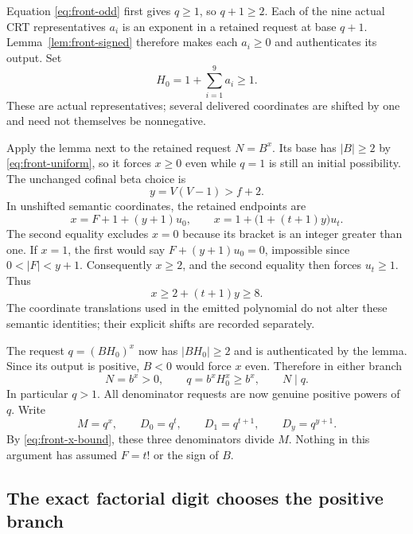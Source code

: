 \documentclass[11pt,letterpaper]{article}
\theoremstyle{definition}
\theoremstyle{remark}
\begin{document}
Equation \eqref{eq:front-odd} first gives $q\geq1$, so $q+1\geq2$.
Each of the nine actual CRT representatives $a_i$ is an exponent in a
retained request at base $q+1$.  Lemma~\ref{lem:front-signed} therefore
makes each $a_i\geq0$ and authenticates its output.  Set
\[
 H_0=1+\sum_{i=1}^{9}a_i\geq1.
\]
These are actual representatives; several delivered coordinates are
shifted by one and need not themselves be nonnegative.

Apply the lemma next to the retained request $N=B^x$.  Its base has
$|B|\geq2$ by \eqref{eq:front-uniform}, so it forces $x\geq0$ even
while $q=1$ is still an initial possibility.  The unchanged cofinal beta
choice is
\[
 y=V(V-1)>f+2.
\]
In unshifted semantic coordinates, the retained endpoints are
\begin{equation}
 x=F+1+(y+1)u_0,
 \qquad
 x=1+\bigl(1+(t+1)y\bigr)u_t.
 \label{eq:front-endpoints}
\end{equation}
The second equality excludes $x=0$ because its bracket is an integer
greater than one.  If $x=1$, the first would say
$F+(y+1)u_0=0$, impossible since $0<|F|<y+1$.  Consequently $x\geq2$,
and the second equality then forces $u_t\geq1$.  Thus
\begin{equation}
 x\geq2+(t+1)y\geq8.
 \label{eq:front-x-bound}
\end{equation}
The coordinate translations used in the emitted polynomial do not alter
these semantic identities; their explicit shifts are recorded separately.

The request $q=(BH_0)^x$ now has $|BH_0|\geq2$ and is authenticated
by the lemma.  Since its output is positive, $B<0$ would force $x$ even.
Therefore in either branch
\begin{equation}
 N=b^x>0,\qquad q=b^xH_0^x\geq b^x,\qquad N\mid q.
 \label{eq:front-radix-bound}
\end{equation}
In particular $q>1$.  All denominator requests are now genuine positive
powers of $q$.  Write
\[
 M=q^x,\qquad D_0=q^t,\qquad D_1=q^{t+1},\qquad D_y=q^{y+1}.
\]
By \eqref{eq:front-x-bound}, these three denominators divide $M$.
Nothing in this argument has assumed $F=t!$ or the sign of $B$.

\subsection{The exact factorial digit chooses the positive branch}
\end{document}
